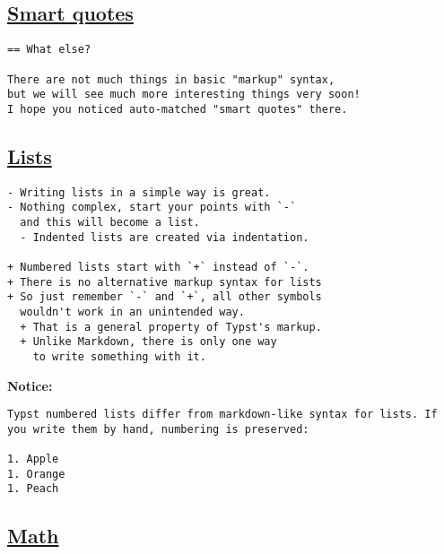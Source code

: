 \subsection{\texorpdfstring{\hyperref[smart-quotes]{Smart
quotes}}{Smart quotes}}\label{smart-quotes}

\begin{verbatim}
== What else?

There are not much things in basic "markup" syntax,
but we will see much more interesting things very soon!
I hope you noticed auto-matched "smart quotes" there.
\end{verbatim}

\pandocbounded{}

\subsection{\texorpdfstring{\hyperref[lists]{Lists}}{Lists}}\label{lists}

\begin{verbatim}
- Writing lists in a simple way is great.
- Nothing complex, start your points with `-`
  and this will become a list.
  - Indented lists are created via indentation.

+ Numbered lists start with `+` instead of `-`.
+ There is no alternative markup syntax for lists
+ So just remember `-` and `+`, all other symbols
  wouldn't work in an unintended way.
  + That is a general property of Typst's markup.
  + Unlike Markdown, there is only one way
    to write something with it.
\end{verbatim}

\pandocbounded{}

\textbf{Notice:}

\begin{verbatim}
Typst numbered lists differ from markdown-like syntax for lists. If you write them by hand, numbering is preserved:

1. Apple
1. Orange
1. Peach
\end{verbatim}

\pandocbounded{}

\subsection{\texorpdfstring{\hyperref[math]{Math}}{Math}}\label{math}


